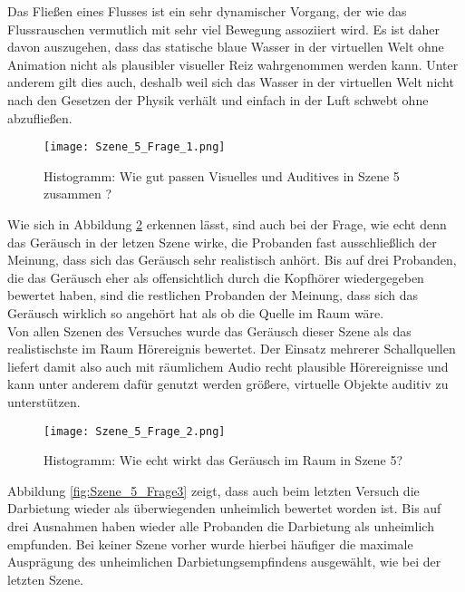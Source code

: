 Das Fließen eines Flusses ist ein sehr dynamischer Vorgang, der wie das Flussrauschen vermutlich mit sehr viel Bewegung assoziiert wird. Es ist daher davon auszugehen, dass das statische blaue Wasser in der virtuellen Welt ohne Animation nicht als plausibler visueller Reiz wahrgenommen werden kann. Unter anderem gilt dies auch, deshalb weil sich das Wasser in der virtuellen Welt nicht nach den Gesetzen der Physik verhält und einfach in der Luft schwebt ohne abzufließen. \\

   \begin{figure}[H]
\centering
\texttt{[image: Szene\_5\_Frage\_1.png]}
\caption{Histogramm: Wie gut passen Visuelles und Auditives in Szene 5 zusammen ?}
\label{fig:Szene_5_Frage1}
\end{figure} 

Wie sich in Abbildung \ref{fig:Szene_5_Frage2} erkennen lässt, sind auch bei der Frage, wie echt denn das Geräusch in der letzen Szene wirke, die Probanden fast ausschließlich der Meinung, dass sich das Geräusch sehr realistisch anhört.  Bis auf drei Probanden, die das Geräusch eher als offensichtlich  durch die Kopfhörer wiedergegeben bewertet haben, sind die restlichen Probanden der Meinung, dass sich das Geräusch wirklich so angehört hat als ob die Quelle im Raum wäre.\\ 

Von allen Szenen des Versuches wurde das Geräusch dieser Szene als das realistischste im Raum Hörereignis bewertet. Der Einsatz mehrerer Schallquellen liefert damit also auch mit räumlichem Audio recht plausible Hörereignisse und kann unter anderem dafür genutzt werden größere, virtuelle Objekte auditiv zu unterstützen. \\ 



   \begin{figure}[H]
\centering
\texttt{[image: Szene\_5\_Frage\_2.png]}
\caption{Histogramm: Wie echt wirkt das Geräusch im Raum in Szene 5?}
\label{fig:Szene_5_Frage2}
\end{figure} 

Abbildung \ref{fig:Szene_5_Frage3} zeigt, dass auch beim letzten Versuch die Darbietung wieder  als überwiegenden unheimlich bewertet worden ist. Bis auf drei Ausnahmen haben wieder alle Probanden die Darbietung als unheimlich empfunden. Bei keiner Szene vorher wurde hierbei häufiger die maximale Ausprägung des unheimlichen Darbietungsempfindens ausgewählt, wie bei der letzten Szene.\\ 

